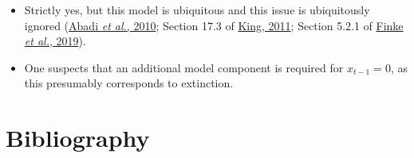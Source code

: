 \documentclass[
  10pt,
  a4paper,
]{article}
\providecommand{\tightlist}{%
  \setlength{\itemsep}{0pt}\setlength{\parskip}{0pt}}
\begin{document}
\begin{itemize}
\tightlist
\item
  Strictly yes, but this model is ubiquitous and this issue is
  ubiquitously ignored
  (\protect\hyperlink{ref-abadi_estimation_2010}{Abadi \emph{et al.},
  2010}; Section 17.3 of
  \protect\hyperlink{ref-king_statistical_2011}{King, 2011}; Section
  5.2.1 of \protect\hyperlink{ref-finke_efficient_2019}{Finke \emph{et
  al.}, 2019}).
\item
  One suspects that an additional model component is required for
  \(x_{t - 1} = 0\), as this presumably corresponds to extinction.
\end{itemize}

\hypertarget{bibliography}{%
\section*{Bibliography}\label{bibliography}}
\end{document}
